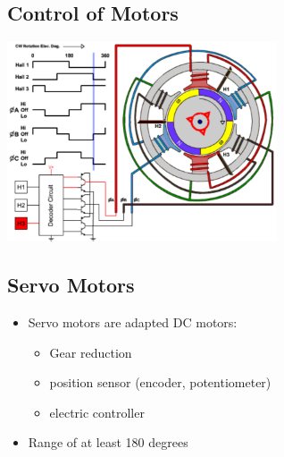 \documentclass[10pt]{article}
\begin{document}
\subsection*{Control of Motors}
\begin{center} 
	\includegraphics*[width=0.6\textwidth]{L2_18.png} 
\end{center}

\subsection*{Servo Motors}
\begin{itemize}
	\item Servo motors are adapted DC motors:
	\begin{itemize}
        \item Gear reduction
        \item position sensor (encoder, potentiometer)
        \item electric controller
    \end{itemize}
    \item Range of at least 180 degrees
\end{itemize}
\end{document}
